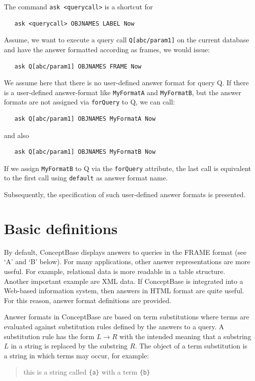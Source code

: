 The command {\tt ask <querycall>}
is a shortcut for
\begin{verbatim}
   ask <querycall> OBJNAMES LABEL Now
\end{verbatim}

Assume, we want to execute a query call {\tt Q[abc/param1]} on the current database and
have the answer formatted according as frames, we would issue:
\begin{verbatim}
   ask Q[abc/param1] OBJNAMES FRAME Now
\end{verbatim}
We assume here that there is no user-defined answer format for query Q. If there is a 
user-defined answer-format like {\tt MyFormatA} and {\tt MyFormatB}, but the answer formats are not 
assigned via {\tt forQuery} to Q, we can call:
\begin{verbatim}
   ask Q[abc/param1] OBJNAMES MyFormatA Now
\end{verbatim}
and also
\begin{verbatim}
   ask Q[abc/param1] OBJNAMES MyFormatB Now
\end{verbatim}
If we assign {\tt MyFormatB} to Q via the {\tt forQuery} attribute, the last call is equivalent to
the first call using {\tt default} as answer format name.

Subsequently, the specification of such user-defined answer formats is presented.


\section{Basic definitions}

By default, ConceptBase displays answers to queries in the FRAME format (see `A' and `B' below). 
For many applications, other answer
representations are more useful. For example, relational data is more readable in a table structure. Another important example are XML data. If
ConceptBase is integrated into a Web-based information system, then answers in HTML format are quite useful. For this reason, answer format
definitions are provided.

Answer formats in ConceptBase are based on term substitutions where terms are evaluated against substitution rules defined by the answers to
a query. A substitution rule has the form $L \longrightarrow R$ with the intended meaning that a substring $L$ in a string is replaced by the substring $R$. The
object of a term substitution is a string in which terms may occur, for example:

\begin{quotation}
    this is a string called \verb+{a}+ with a term \verb+{b}+
\end{quotation}

